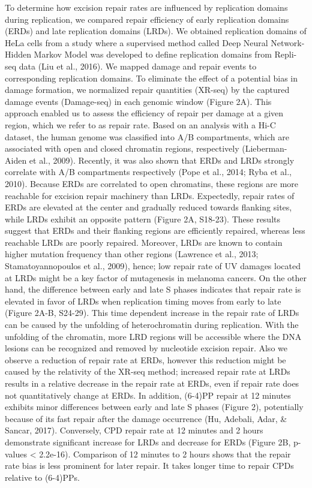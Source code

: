 To determine how excision repair rates are influenced by replication domains during replication, we compared repair efficiency of early replication domains (ERDs) and late replication domains (LRDs). We obtained replication domains of HeLa cells from a study where a supervised method called Deep Neural Network-Hidden Markov Model was developed to define replication domains from Repli-seq data (Liu et al., 2016). We mapped damage and repair events to corresponding replication domains. To eliminate the effect of a potential bias in damage formation, we normalized repair quantities (XR-seq) by the captured damage events (Damage-seq) in each genomic window (Figure 2A). This approach enabled us to assess the efficiency of repair per damage at a given region, which we refer to as repair rate. Based on an analysis with a Hi-C dataset, the human genome was classified into A/B compartments, which are associated with open and closed chromatin regions, respectively (Lieberman-Aiden et al., 2009). Recently, it was also shown that ERDs and LRDs strongly correlate with A/B compartments respectively (Pope et al., 2014; Ryba et al., 2010). Because ERDs are correlated to open chromatins, these regions are more reachable for excision repair machinery than LRDs. Expectedly, repair rates of ERDs are elevated at the center and gradually reduced towards flanking sites, while LRDs exhibit an opposite pattern (Figure 2A, S18-23). These results suggest that ERDs and their flanking regions are efficiently repaired, whereas less reachable LRDs are poorly repaired. Moreover, LRDs are known to contain higher mutation frequency than other regions (Lawrence et al., 2013; Stamatoyannopoulos et al., 2009), hence; low repair rate of UV damages located at LRDs might be a key factor of mutagenesis in melanoma cancers. 
On the other hand, the difference between early and late S phases indicates that repair rate is elevated in favor of LRDs when replication timing moves from early to late (Figure 2A-B, S24-29). This time dependent increase in the repair rate of LRDs can be caused by the unfolding of heterochromatin during replication. With the unfolding of the chromatin, more LRD regions will be accessible where the DNA lesions can be recognized and removed by nucleotide excision repair. Also we observe a reduction of repair rate at ERDs, however this reduction might be caused by the relativity of the XR-seq method; increased repair rate at LRDs results in a relative decrease in the repair rate at ERDs, even if repair rate does not quantitatively change at ERDs. In addition, (6-4)PP repair at 12 minutes exhibits minor differences between early and late S phases (Figure 2), potentially because of its fast repair after the damage occurrence (Hu, Adebali, Adar, \& Sancar, 2017). Conversely, CPD repair rate at 12 minutes and 2 hours demonstrate significant increase for LRDs and decrease for ERDs (Figure 2B, p-values < 2.2e-16). Comparison of 12 minutes to 2 hours shows that the repair rate bias is less prominent for later repair. It takes longer time to repair CPDs relative to (6-4)PPs.

